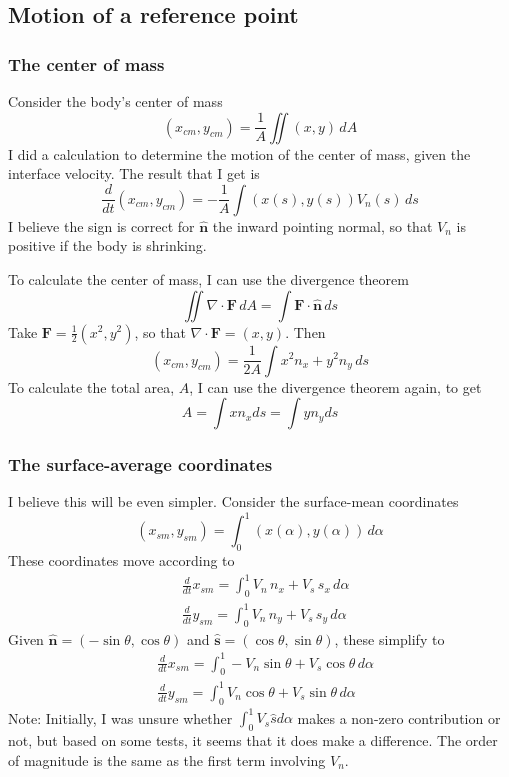 \documentclass[11pt]{article}
\newcommand{\td}[2] { \frac{d #1} { d #2 } }
\newcommand{\grad}{\nabla}
\newcommand{\bvec}[1]{\ensuremath{\boldsymbol{#1}}}
\newcommand{\nhat}{\hat{\bvec{n}}}
\newcommand{\shat}{\hat{\bvec{s}}}
\begin{document}
\subsection{Motion of a reference point}

\subsubsection{The center of mass}
Consider the body's center of mass
\begin{equation}
(x_{cm}, y_{cm}) = \frac{1}{A} \iint (x, y) \, dA
\end{equation}
I did a calculation to determine the motion of the center of mass, given the interface velocity. The result that I get is
\begin{equation}
\td{}{t} (x_{cm}, y_{cm})  = -\frac{1}{A} \int (x(s), y(s)) V_n(s) \, ds
\end{equation}
I believe the sign is correct for $\nhat$ the inward pointing normal, so that $V_n$ is positive if the body is shrinking.

To calculate the center of mass, I can use the divergence theorem
\begin{equation}
\iint \grad \cdot \bvec{F} \, dA = \int \bvec{F} \cdot \nhat \, ds
\end{equation}
Take $\bvec{F} = \frac{1}{2} (x^2, y^2)$, so that $\grad \cdot \bvec{F} = (x,y)$. Then
\begin{equation}
(x_{cm}, y_{cm} ) = \frac{1}{2 A} \int x^2 n_x + y^2 n_y \, ds
\end{equation}
To calculate the total area, $A$, I can use the divergence theorem again, to get
\begin{equation}
A = \int x n_x ds = \int y n_y ds
\end{equation}

\subsubsection{The surface-average coordinates}
I believe this will be even simpler. Consider the surface-mean coordinates
\begin{equation}
(x_{sm}, y_{sm}) = \int_0^1 (x(\alpha), y(\alpha)) \, d\alpha
\end{equation}
These coordinates move according to
\begin{align}
& \td{}{t} x_{sm} = \int_0^1 V_n \, n_x + V_s \, s_x \, d\alpha \\
& \td{}{t} y_{sm} = \int_0^1 V_n \, n_y + V_s \, s_y \, d\alpha
\end{align}
Given $\nhat = (-\sin \theta, \cos \theta)$ and $\shat = (\cos \theta, \sin \theta)$, these simplify to
\begin{align}
& \td{}{t} x_{sm} = \int_0^1 -V_n \sin \theta + V_s \cos \theta \, d\alpha \\
& \td{}{t} y_{sm} = \int_0^1 V_n \cos \theta + V_s \sin \theta \, d\alpha
\end{align}
Note: Initially, I was unsure whether $\int_0^1 V_s \hat{s} d\alpha$ makes a non-zero contribution or not, but based on some tests, it seems that it does make a difference. The order of magnitude is the same as the first term involving $V_n$.
\end{document}
